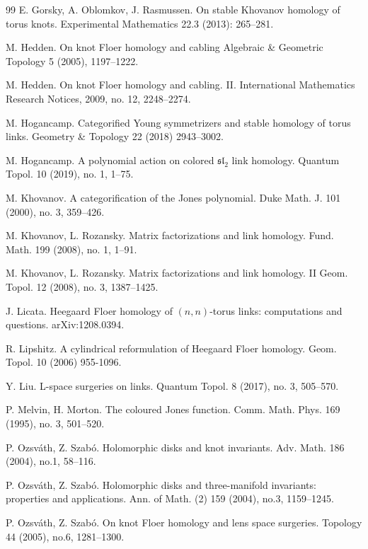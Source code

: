 \begin{thebibliography}{99}
 E. Gorsky, A. Oblomkov, J. Rasmussen. On stable Khovanov homology of torus knots. Experimental Mathematics 22.3 (2013): 265--281.

 M. Hedden. On knot Floer homology and cabling
Algebraic \& Geometric Topology 5 (2005), 1197--1222.

  M. Hedden. On knot Floer homology and cabling. II.
International Mathematics Research Notices, 2009, no. 12, 2248--2274.

M. Hogancamp. Categorified Young symmetrizers and stable homology of torus links.
Geometry \& Topology 22 (2018) 2943--3002.

 M. Hogancamp. A polynomial action on colored  $\mathfrak{sl}_2$  link homology.
Quantum Topol. 10 (2019), no. 1, 1--75.


  M. Khovanov. A categorification of the Jones polynomial.
Duke Math. J. 101 (2000), no. 3, 359--426.

 M. Khovanov, L. Rozansky. Matrix factorizations and link homology.
Fund. Math. 199 (2008), no. 1, 1--91.

  M. Khovanov, L. Rozansky. Matrix factorizations and link homology. II
Geom. Topol. 12 (2008), no. 3, 1387--1425.


 J. Licata. Heegaard Floer homology of $(n,n)$-torus links: computations and questions.  arXiv:1208.0394.

 R. Lipshitz. A cylindrical reformulation of Heegaard Floer homology. Geom. Topol. 10 (2006) 955-1096.

 Y. Liu. L-space surgeries on links. Quantum Topol. 8 (2017), no. 3, 505--570.

 P. Melvin, H. Morton. The coloured Jones function. Comm. Math. Phys. 169 (1995), no. 3, 501--520.



 P. Ozsv\'ath, Z. Szab\'o. Holomorphic disks and knot invariants. Adv. Math. 186 (2004), no.1, 58--116. 



 P. Ozsv\'ath, Z. Szab\'o. Holomorphic disks and three-manifold invariants: properties  and applications. Ann. of Math. (2) 159 (2004), no.3, 1159--1245. 

 P. Ozsv\'ath, Z. Szab\'o. On knot Floer homology and lens space surgeries. Topology 44 (2005), no.6, 1281--1300.



\end{thebibliography}
